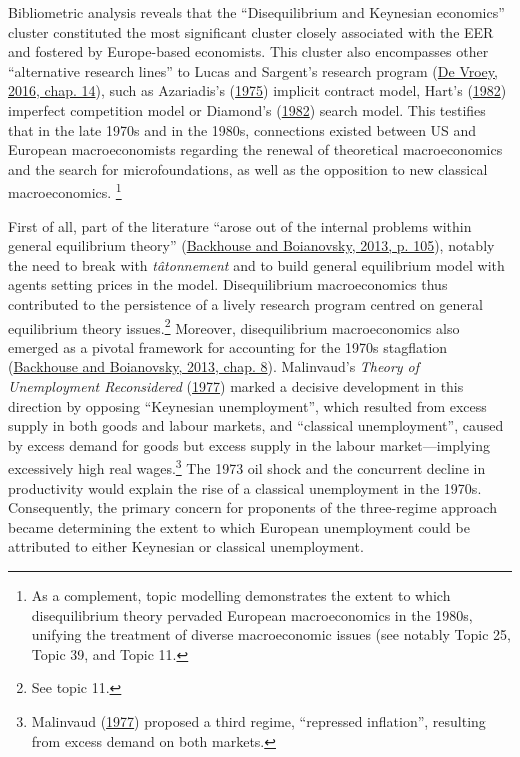 \documentclass[
  12pt,
  onecolumn]{article}
\begin{document}
Bibliometric analysis reveals that the ``Disequilibrium and Keynesian
economics'' cluster constituted the most significant cluster closely
associated with the EER and fostered by Europe-based economists. This
cluster also encompasses other ``alternative research lines'' to Lucas
and Sargent's research program (\protect\hyperlink{ref-devroey2016}{De
Vroey, 2016, chap. 14}), such as Azariadis's
(\protect\hyperlink{ref-azariadis1975}{1975}) implicit contract model,
Hart's (\protect\hyperlink{ref-hart1982}{1982}) imperfect competition
model or Diamond's (\protect\hyperlink{ref-diamond1982}{1982}) search
model. This testifies that in the late 1970s and in the 1980s,
connections existed between US and European macroeconomists regarding
the renewal of theoretical macroeconomics and the search for
microfoundations, as well as the opposition to new classical
macroeconomics. \footnote{As a complement, topic modelling demonstrates
  the extent to which disequilibrium theory pervaded European
  macroeconomics in the 1980s, unifying the treatment of diverse
  macroeconomic issues (see notably Topic 25, Topic 39, and Topic 11.}

First of all, part of the literature ``arose out of the internal
problems within general equilibrium theory''
(\protect\hyperlink{ref-backhouseboianovski2013}{Backhouse and
Boianovsky, 2013, p. 105}), notably the need to break with
\emph{tâtonnement} and to build general equilibrium model with agents
setting prices in the model. Disequilibrium macroeconomics thus
contributed to the persistence of a lively research program centred on
general equilibrium theory issues.\footnote{See topic 11.} Moreover,
disequilibrium macroeconomics also emerged as a pivotal framework for
accounting for the 1970s stagflation
(\protect\hyperlink{ref-backhouseboianovski2013}{Backhouse and
Boianovsky, 2013, chap. 8}). Malinvaud's \emph{Theory of Unemployment
Reconsidered} (\protect\hyperlink{ref-malinvaud1977}{1977}) marked a
decisive development in this direction by opposing ``Keynesian
unemployment'', which resulted from excess supply in both goods and
labour markets, and ``classical unemployment'', caused by excess demand
for goods but excess supply in the labour market---implying excessively
high real wages.\footnote{Malinvaud
  (\protect\hyperlink{ref-malinvaud1977}{1977}) proposed a third regime,
  ``repressed inflation'', resulting from excess demand on both markets.}
The 1973 oil shock and the concurrent decline in productivity would
explain the rise of a classical unemployment in the 1970s. Consequently,
the primary concern for proponents of the three-regime approach became
determining the extent to which European unemployment could be
attributed to either Keynesian or classical unemployment.
\end{document}
